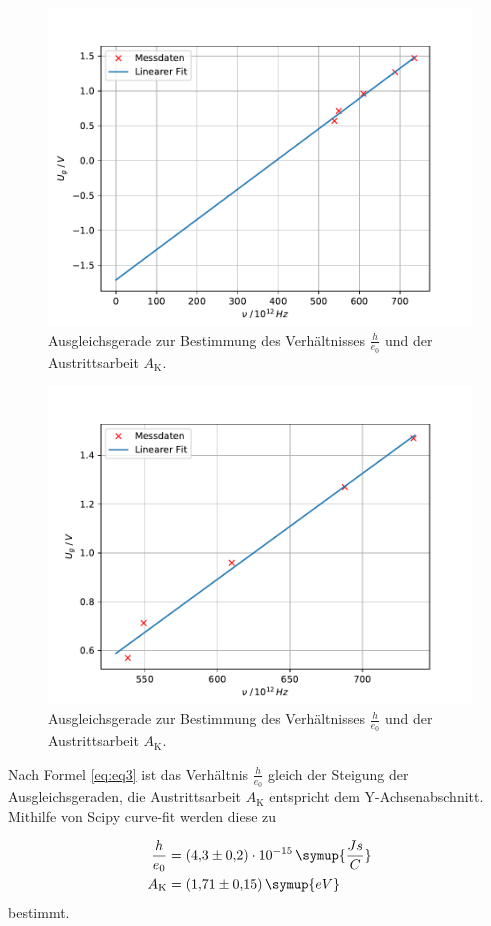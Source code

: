 \begin{figure}[h!tbp]
	\centering
	\includegraphics[width=0.8\linewidth]{verhaeltnis.pdf}
	\caption{Ausgleichsgerade zur Bestimmung des Verhältnisses $\frac{h}{e_0}$ und der Austrittsarbeit $A_{\text{K}}$.}
	\label{fig:verhaeltnis}
\end{figure}

\begin{figure}[h!tbp]
	\centering
	\includegraphics[width=0.8\linewidth]{verhaeltnis2.pdf}
	\caption{Ausgleichsgerade zur Bestimmung des Verhältnisses $\frac{h}{e_0}$ und der Austrittsarbeit $A_{\text{K}}$.}
	\label{fig:verhaeltnis}
\end{figure}


Nach Formel \ref{eq:eq3} ist das Verhältnis $\frac{h}{e_0}$ gleich der Steigung der Ausgleichsgeraden, die Austrittsarbeit $A_{\text{K}}$ entspricht dem Y-Achsenabschnitt. Mithilfe von Scipy curve-fit werden diese zu

\begin{equation*}
\begin{aligned}
\frac{h}{e_0} &= (4{,}3 \pm 0{,}2 )\cdot 10^{-15}\, \symup{\frac{Js}{C}} \\
A_{\text{K}} &= (1{,}71 \pm 0{,}15)\, \symup{eV}
\end{aligned}
\end{equation*}
bestimmt.




